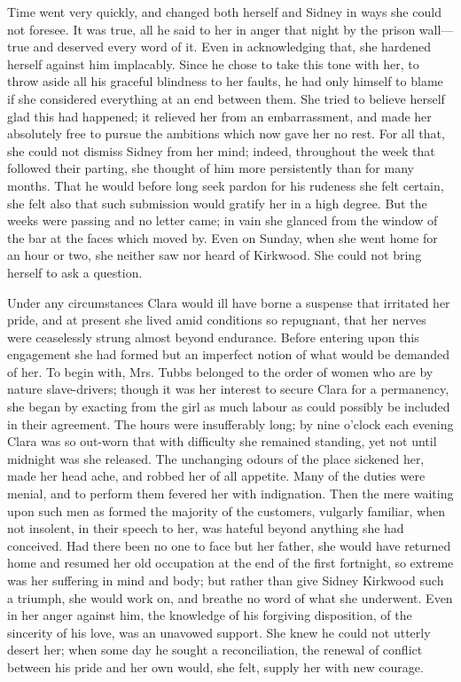 Time went very quickly, and changed both herself and Sidney in ways she
could not foresee. It was true, all he said to her in anger that night
by the prison wall---true and deserved every word of it. Even in
acknowledging that, she hardened herself against him implacably. Since
he chose to take this tone with her, to throw aside all his graceful
blindness to her faults, he had only himself to
{\protect\hypertarget{202}{}{}}blame if she considered everything at an
end between them. She tried to believe herself glad this had happened;
it relieved her from an embarrassment, and made her absolutely free to
pursue the ambitions which now gave her no rest. For all that, she could
not dismiss Sidney from her mind; indeed, throughout the week that
followed their parting, she thought of him more persistently than for
many months. That he would before long seek pardon for his rudeness she
felt certain, she felt also that such submission would gratify her in a
high degree. But the weeks were passing and no letter came; in vain she
glanced from the window of the bar at the faces which moved by. Even on
Sunday, when she went home for an hour or two, she neither saw nor heard
of Kirkwood. She could not bring herself to ask a question.

Under any circumstances Clara would ill have borne a suspense that
irritated her pride, and at present she lived amid conditions so
repugnant, that her nerves were ceaselessly strung almost beyond
endurance. Before {\protect\hypertarget{203}{}{}}entering upon this
engagement she had formed but an imperfect notion of what would be
demanded of her. To begin with, Mrs. Tubbs belonged to the order of
women who are by nature slave-drivers; though it was her interest to
secure Clara for a permanency, she began by exacting from the girl as
much labour as could possibly be included in their agreement. The hours
were insufferably long; by nine o'clock each evening Clara was so
out-worn that with difficulty she remained standing, yet not until
midnight was she released. The unchanging odours of the place sickened
her, made her head ache, and robbed her of all appetite. Many of the
duties were menial, and to perform them fevered her with indignation.
Then the mere waiting upon such men as formed the majority of the
customers, vulgarly familiar, when not insolent, in their speech to her,
was hateful beyond anything she had conceived. Had there been no one to
face but her father, she would have returned home and resumed her old
occupation at the end of the first fortnight, so extreme
{\protect\hypertarget{204}{}{}}was her suffering in mind and body; but
rather than give Sidney Kirkwood such a triumph, she would work on, and
breathe no word of what she underwent. Even in her anger against him,
the knowledge of his forgiving disposition, of the sincerity of his
love, was an unavowed support. She knew he could not utterly desert her;
when some day he sought a reconciliation, the renewal of conflict
between his pride and her own would, she felt, supply her with new
courage.

